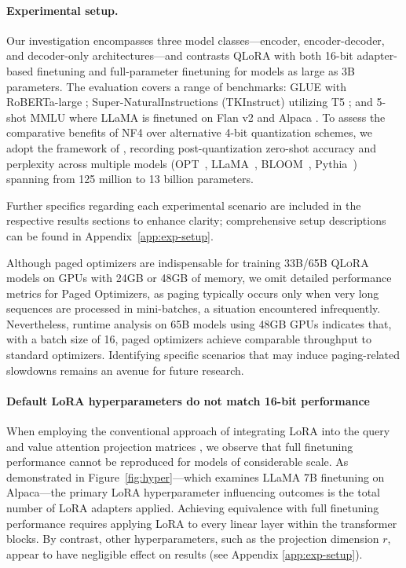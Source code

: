 \paragraph{Experimental setup.} Our investigation encompasses three model classes—encoder, encoder-decoder, and decoder-only architectures—and contrasts QLoRA with both 16-bit adapter-based finetuning and full-parameter finetuning for models as large as 3B parameters. The evaluation covers a range of benchmarks: GLUE \citep{wang2018glue} with RoBERTa-large \citep{liu2019roberta}; Super-NaturalInstructions (TKInstruct) \citep{wang2022super} utilizing T5 \citep{t5}; and 5-shot MMLU \citep{hendrycksmeasuring} where LLaMA is finetuned on Flan v2 \citep{longpre2023flan} and Alpaca \citep{alpaca}. To assess the comparative benefits of NF4 over alternative 4-bit quantization schemes, we adopt the framework of \citet{dettmers2022case}, recording post-quantization zero-shot accuracy and perplexity across multiple models (OPT~\citep{zhang2022opt}, LLaMA~\citep{touvron2023llama}, BLOOM~\citep{scao2022bloom}, Pythia~\citep{biderman2023pythia}) spanning from 125 million to 13 billion parameters.

Further specifics regarding each experimental scenario are included in the respective results sections to enhance clarity; comprehensive setup descriptions can be found in Appendix~\ref{app:exp-setup}.

Although paged optimizers are indispensable for training 33B/65B \textsc{QLoRA} models on GPUs with 24GB or 48GB of memory, we omit detailed performance metrics for Paged Optimizers, as paging typically occurs only when very long sequences are processed in mini-batches, a situation encountered infrequently. Nevertheless, runtime analysis on 65B models using 48GB GPUs indicates that, with a batch size of 16, paged optimizers achieve comparable throughput to standard optimizers. Identifying specific scenarios that may induce paging-related slowdowns remains an avenue for future research.

\paragraph{Default LoRA hyperparameters do not match 16-bit performance}

When employing the conventional approach of integrating LoRA into the query and value attention projection matrices \citep{hu2021lora}, we observe that full finetuning performance cannot be reproduced for models of considerable scale. As demonstrated in Figure~\ref{fig:hyper}—which examines LLaMA 7B finetuning on Alpaca—the primary LoRA hyperparameter influencing outcomes is the total number of LoRA adapters applied. Achieving equivalence with full finetuning performance requires applying LoRA to every linear layer within the transformer blocks. By contrast, other hyperparameters, such as the projection dimension $r$, appear to have negligible effect on results (see Appendix \ref{app:exp-setup}).

